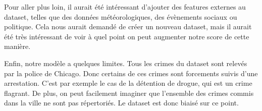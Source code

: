 \documentclass{article}
\begin{document}
    Pour aller plus loin, il aurait été intéressant d'ajouter des features
    externes au dataset, telles que des données météorologiques, des
    évènements sociaux ou politique. Cela nous aurait demandé de créer un
    nouveau dataset, mais il aurait été très intéressant de voir à quel 
    point on peut augmenter notre score de cette manière.

    Enfin, notre modèle a quelques limites. Tous les crimes du dataset sont
    relevés par la police de Chicago. Donc certains de ces crimes sont
    forcements suivis d'une arrestation. C'est par exemple le cas de la
    détention de drogue, qui est un crime flagrant.
    De plus, on peut facilement imaginer que l'ensemble des crimes commis
    dans la ville ne sont pas répertoriés. Le dataset est donc biaisé sur ce
    point.
\end{document}
